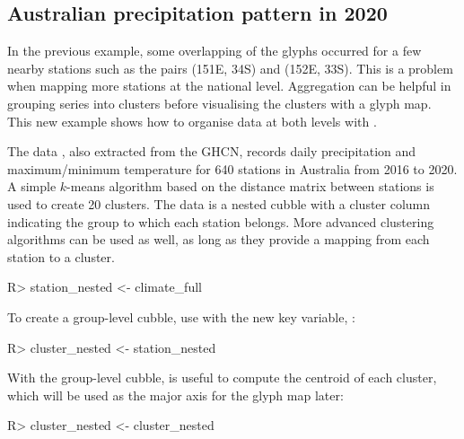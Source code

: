\documentclass[
]{jss}
\begin{document}
\hypertarget{precip}{%
\subsection{Australian precipitation pattern in 2020}\label{precip}}

In the previous example, some overlapping of the glyphs occurred for a few nearby stations such as the pairs (151E, 34S) and (152E, 33S). This is a problem when mapping more stations at the national level. Aggregation can be helpful in grouping series into clusters before visualising the clusters with a glyph map. This new example shows how to organise data at both levels with .

The data , also extracted from the GHCN, records daily precipitation and maximum/minimum temperature for 640 stations in Australia from 2016 to 2020. A simple \(k\)-means algorithm based on the distance matrix between stations is used to create 20 clusters. The data  is a nested cubble with a cluster column indicating the group to which each station belongs. More advanced clustering algorithms can be used as well, as long as they provide a mapping from each station to a cluster.

\begin{CodeChunk}
\begin{CodeInput}
R> station_nested <- climate_full %
\end{CodeInput}
\end{CodeChunk}

To create a group-level cubble, use  with the new key variable, :

\begin{CodeChunk}
\begin{CodeInput}
R> cluster_nested <- station_nested %
\end{CodeInput}
\end{CodeChunk}

With the group-level cubble,  is useful to compute the centroid of each cluster, which will be used as the major axis for the glyph map later:

\begin{CodeChunk}
\begin{CodeInput}
R> cluster_nested <- cluster_nested %
\end{CodeInput}
\end{CodeChunk}
\end{document}
